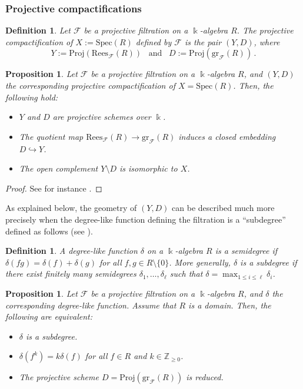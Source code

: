\documentclass[12pt,letterpaper, reqno]{amsart}
\newtheorem{proposition}[theorem]{Proposition}
\theoremstyle{defstyle} \newtheorem{definition}[theorem]{Definition}
\theoremstyle{remark}
\numberwithin{equation}{section}
\numberwithin{figure}{section}
\newcommand{\cF} {\mathcal{F}}
\newcommand{\Spec} {\mathrm{Spec}}
\newcommand{\Proj} {\mathrm{Proj}}
\newcommand{\gr} {\mathrm{gr}}
\newcommand{\kk} {\Bbbk}
\newcommand{\ZZ} {\mathbb{Z}}
\begin{document}
\subsubsection{Projective compactifications}

\begin{definition} \label{def_projective_compactification}
    Let $\cF$ be a projective filtration on a $\kk$-algebra $R$. 
    The \emph{projective compactification} of $X:=\Spec(R)$ defined by $\cF$ is the pair $(Y,D)$, where
\[Y:= \Proj\left( \mathrm{Rees}_\cF(R)\right) \,\,\,\,\,\text{and}\,\,\,\,\, D:=\Proj \left( \gr_\cF(R) \right)\,.\]
\end{definition}

\begin{proposition}
    Let  $\cF$ be a projective filtration on a $\kk$-algebra $R$, and $(Y,D)$ the corresponding projective compactification of $X=\Spec(R)$. Then, the following hold:
    \begin{itemize}
        \item[(i)] $Y$ and $D$ are projective schemes over $\kk$.
        \item[(ii)] The quotient map $\mathrm{Rees}_\cF(R) \rightarrow \gr_\cF(R)$ induces a closed embedding $D \hookrightarrow Y$.
        \item[(iii)] The open complement $Y \setminus D$ is isomorphic to $X$.
    \end{itemize}
\end{proposition}

\begin{proof}
See for instance \cite[Proposition 2.8]{mondal2014projective}.
\end{proof}

As explained below, the geometry of $(Y,D)$ can be described much more precisely when the degree-like function defining the filtration is a ``subdegree'' defined as follows (see  \cite[Definition 3.3]{mondal2014projective}).

\begin{definition}
A degree-like function $\delta$ on a $\kk$-algebra $R$ is a \emph{semidegree} if $\delta(fg) =\delta(f)+\delta(g)$ for all $f,g \in R \setminus \{0\}$. More generally, $\delta$ is a \emph{subdegree} if there  exist finitely many semidegrees $\delta_1,\dots,\delta_{\ell}$ such that $\delta=\max_{1 \leq i \leq \ell} \delta_i$.
\end{definition}

\begin{proposition}
  Let $\cF$ be a projective filtration on a $\kk$-algebra $R$, and $\delta$ the corresponding degree-like function. Assume that $R$ is a domain. Then, the following are equivalent:
  \begin{itemize}
      \item[(i)] $\delta$ is a subdegree.
      \item[(ii)] $\delta(f^k)=k \delta(f)$ for all $f \in R$ and $k \in \ZZ_{\geq 0}$.
      \item[(iii)] The projective scheme $D=\mathrm{Proj} \left( \gr_\cF(R) \right)$ is reduced.
  \end{itemize}
\end{proposition}
\end{document}
